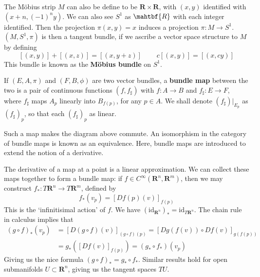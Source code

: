 \begin{example}
    The M\"{o}bius strip $M$ can also be define to be $\mathbf{R} \times \mathbf{R}$, with $(x,y)$ identified with $(x + n, (-1)^n y)$. We can also see $S^1$ as $\mahtbf{R}$ with each integer identified. Then the projection $\pi(x,y) = x$ induces a projection $\pi: M \to S^1$. $(M, S^1, \pi)$ is then a tangent bundle, if we ascribe a vector space structure to $M$ by defining
    \[ [(x,y)] + [(x,z)] = [(x, y + z)]\ \ \ \ \ \ \ \ \ \ c[(x,y)] = [(x,cy)] \]
    This bundle is known as the {\bf M\"{o}bius bundle} on $S^1$.
\end{example}

If $(E,A,\pi)$ and $(F,B,\phi)$ are two vector bundles, a {\bf bundle map} between the two is a pair of continuous functions $(f,f_\sharp)$ with $f:A \to B$ and $f_\sharp:E \to F$, where $f_\sharp$ maps $A_p$ linearly into $B_{f(p)}$, for any $p \in A$. We shall denote $(f_\sharp)|_{E_p}$ as $(f_\sharp)_p$, so that each $(f_\sharp)_p$ as linear.
%
\begin{center}
\end{center}
%
Such a map makes the diagram above commute. An isomorphism in the category of bundle maps is known as an equivalence. Here, bundle maps are introduced to extend the notion of a derivative.

\begin{example}
    The derivative of a map at a point is a linear approximation. We can collect these maps together to form a bundle map: if $f \in C^\infty(\mathbf{R}^n, \mathbf{R}^m)$, then we may construct $f_*:T\mathbf{R}^n \to T\mathbf{R}^m$, defined by
    \[ f_*(v_p) = [Df(p)(v)]_{f(p)} \]
    This is the `infinitisimal action' of $f$. We have $(\text{id}_{\mathbf{R}^n})_* = \text{id}_{T\mathbf{R}^n}$. The chain rule in calculus implies that
    \begin{align*}
        (g \circ f)_*(v_p) &= [D(g \circ f)(v)]_{(g \circ f)(p)} = [Dg(f(v)) \circ Df(v)]_{g(f(p))}\\
        &= g_*([Df(v)]_{f(p)}) = (g_* \circ f_*)(v_p)
    \end{align*}
    Giving us the nice formula $(g \circ f)_* = g_* \circ f_*$. Similar results hold for open submanifolds $U \subset \mathbf{R}^n$, giving us the tangent spaces $TU$.
\end{example}

